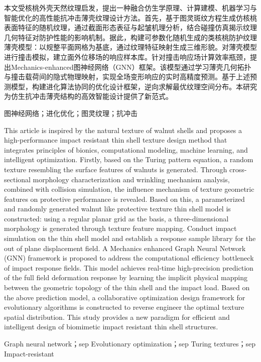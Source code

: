 \begin{abstractCN}
   本文受核桃外壳天然纹理启发，提出一种融合仿生学原理、计算建模、机器学习与智能优化的高性能抗冲击薄壳纹理设计方法。首先，基于图灵斑纹方程生成仿核桃表面特征的随机纹理，通过截面形态表征与起皱机理分析，结合碰撞仿真揭示纹理几何特征对防护性能的影响机制。据此，构建可参数化随机生成的类核桃防护纹理薄壳模型：以规整平面网格为基底，通过纹理特征映射生成三维形貌。对薄壳模型进行撞击模拟，建立面外位移场的响应样本库。针对撞击响应场计算效率瓶颈，提出Mechanics-enhanced图神经网络（GNN）框架。该模型通过学习薄壳几何拓扑与撞击载荷间的隐式物理映射，实现全场变形响应的实时高精度预测。基于上述预测模型，构建进化算法协同的优化设计框架，逆向求解最优纹理空间分布。本研究为仿生抗冲击薄壳结构的高效智能设计提供了新范式。

    \keywordsCN 图神经网络；进化优化；图灵纹理；抗冲击
\end{abstractCN}

\begin{abstractENG}
    This article is inspired by the natural texture of walnut shells and proposes a high-performance impact resistant thin shell texture design method that integrates principles of bionics, computational modeling, machine learning, and intelligent optimization. Firstly, based on the Turing pattern equation, a random texture resembling the surface features of walnuts is generated. Through cross-sectional morphology characterization and wrinkling mechanism analysis, combined with collision simulation, the influence mechanism of texture geometric features on protective performance is revealed. Based on this, a parameterized and randomly generated walnut like protective texture thin shell model is constructed: using a regular planar grid as the basis, a three-dimensional morphology is generated through texture feature mapping. Conduct impact simulation on the thin shell model and establish a response sample library for the out of plane displacement field. A Mechanics enhanced Graph Neural Network (GNN) framework is proposed to address the computational efficiency bottleneck of impact response fields. This model achieves real-time high-precision prediction of the full field deformation response by learning the implicit physical mapping between the geometric topology of the thin shell and the impact load. Based on the above prediction model, a collaborative optimization design framework for evolutionary algorithms is constructed to reverse engineer the optimal texture spatial distribution. This study provides a new paradigm for efficient and intelligent design of biomimetic impact resistant thin shell structures.

    \keywordsENG Graph neural network；sep Evolutionary optimization；sep Turing textures；sep Impact-resistant
\end{abstractENG}
